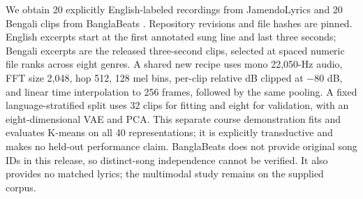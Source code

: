 We obtain 20 explicitly English-labeled recordings from JamendoLyrics \citep{durand2023} and 20 Bengali clips from BanglaBeats \citep{jibon2023}. Repository revisions and file hashes are pinned. English excerpts start at the first annotated sung line and last three seconds; Bengali excerpts are the released three-second clips, selected at spaced numeric file ranks across eight genres. A shared new recipe uses mono 22,050-Hz audio, FFT size 2,048, hop 512, 128 mel bins, per-clip relative dB clipped at $-80$ dB, and linear time interpolation to 256 frames, followed by the same pooling. A fixed language-stratified split uses 32 clips for fitting and eight for validation, with an eight-dimensional VAE and PCA. This separate course demonstration fits and evaluates K-means on all 40 representations; it is explicitly transductive and makes no held-out performance claim. BanglaBeats does not provide original song IDs in this release, so distinct-song independence cannot be verified. It also provides no matched lyrics; the multimodal study remains on the supplied corpus.
